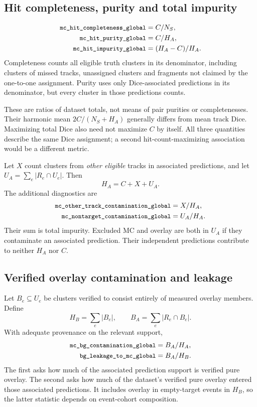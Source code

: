 \documentclass[11pt,letterpaper]{article}
\newcommand{\metric}[1]{\texttt{\small\detokenize{#1}}}
\begin{document}
\subsection{Hit completeness, purity and total impurity}
\begin{align}
 \metric{mc_hit_completeness_global}&=C/N_S,\\
 \metric{mc_hit_purity_global}&=C/H_A,\\
 \metric{mc_hit_impurity_global}&=(H_A-C)/H_A.
\end{align}
Completeness counts all eligible truth clusters in its denominator, including
clusters of missed tracks, unassigned clusters and fragments not claimed by the
one-to-one assignment. Purity uses only Dice-associated predictions in its
denominator, but every cluster in those predictions counts.

These are ratios of dataset totals, not means of pair purities or completenesses.
Their harmonic mean $2C/(N_S+H_A)$ generally differs from mean track Dice.
Maximizing total Dice also need not maximize $C$ by itself. All three quantities
describe the same Dice assignment; a second hit-count-maximizing association
would be a different metric.

Let $X$ count clusters from \emph{other eligible} tracks in associated predictions,
and let $U_A=\sum_e|R_e\cap U_e|$. Then
\begin{equation}
 H_A=C+X+U_A.
\end{equation}
The additional diagnostics are
\begin{align}
 \metric{mc_other_track_contamination_global}&=X/H_A,\\
 \metric{mc_nontarget_contamination_global}&=U_A/H_A.
\end{align}
Their sum is total impurity. Excluded MC and overlay are both in $U_A$ if they
contaminate an associated prediction. Their independent predictions contribute
to neither $H_A$ nor $C$.

\subsection{Verified overlay contamination and leakage}

Let $B_e\subseteq U_e$ be clusters verified to consist entirely of measured
overlay members. Define
\begin{equation}
 H_B=\sum_e|B_e|,\qquad B_A=\sum_e|R_e\cap B_e|.
\end{equation}
With adequate provenance on the relevant support,
\begin{align}
 \metric{mc_bg_contamination_global}&=B_A/H_A,\\
 \metric{bg_leakage_to_mc_global}&=B_A/H_B.
\end{align}
The first asks how much of the associated prediction support is verified pure
overlay. The second asks how much of the dataset's verified pure overlay entered
those associated predictions. It includes overlay in empty-target events in
$H_B$, so the latter statistic depends on event-cohort composition.
\end{document}
